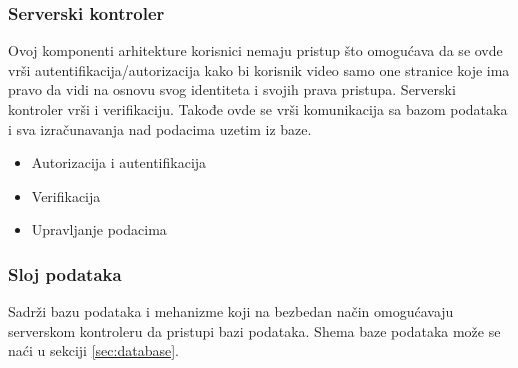 \subsubsection{Serverski kontroler}
Ovoj komponenti arhitekture korisnici nemaju pristup što omogućava da se ovde vrši autentifikacija/autorizacija kako bi korisnik video samo one stranice koje ima pravo da vidi na osnovu svog identiteta i svojih prava pristupa. Serverski kontroler vrši i verifikaciju. Takođe ovde se vrši komunikacija sa bazom podataka i sva izračunavanja nad podacima uzetim iz baze.
\begin{itemize}
    \item Autorizacija i autentifikacija
    \item Verifikacija
    \item Upravljanje podacima
\end{itemize}


\subsubsection{Sloj podataka}
Sadrži bazu podataka i mehanizme koji na bezbedan način omogućavaju serverskom kontroleru da pristupi bazi podataka. Shema baze podataka može se naći u sekciji \ref{sec:database}.